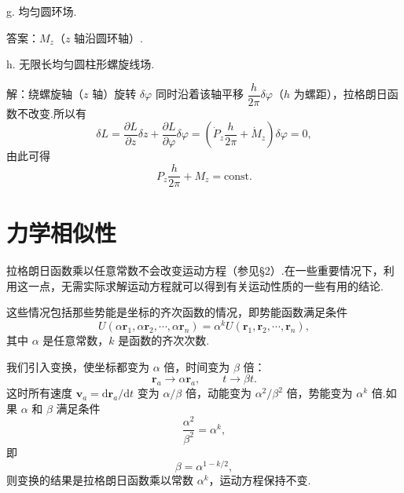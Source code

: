 \begin{xiti}
g. 均匀圆环场.

答案：$M_z$（$z$ 轴沿圆环轴）.

h. 无限长均匀圆柱形螺旋线场.

解：绕螺旋轴（$z$ 轴）旋转 $\delta\varphi$ 同时沿着该轴平移 $\dfrac{h}{2\pi}\delta\varphi$（$h$ 为螺距），拉格朗日函数不改变.所以有
\begin{equation*}
  \delta L=\frac{\partial L}{\partial z}\delta z
  +\frac{\partial L}{\partial\varphi}\delta\varphi
  =\left(\dot{P}_z\frac{h}{2\pi}+\dot{M}_z\right)\delta\varphi=0,
\end{equation*}
由此可得
\begin{equation*}
  P_z\frac{h}{2\pi}+M_z=\mathrm{const}.
\end{equation*}

\end{xiti}

\section{力学相似性}

拉格朗日函数乘以任意常数不会改变运动方程（参见§2）.在一些重要情况下，利用这一点，无需实际求解运动方程就可以得到有关运动性质的一些有用的结论.

这些情况包括那些势能是坐标的齐次函数的情况，即势能函数满足条件
\begin{equation}
  U(\alpha\boldsymbol{r}_1,\alpha\boldsymbol{r}_2,\cdots,\alpha\boldsymbol{r}_n)
  =\alpha^k U(\boldsymbol{r}_1,\boldsymbol{r}_2,\cdots,\boldsymbol{r}_n),
\end{equation}
其中 $\alpha$ 是任意常数，$k$ 是函数的齐次次数.

我们引入变换，使坐标都变为 $\alpha$ 倍，时间变为 $\beta$ 倍：
\begin{equation*}
  \boldsymbol{r}_a\to\alpha\boldsymbol{r}_a,\qquad t\to\beta t.
\end{equation*}
这时所有速度 $\boldsymbol{v}_a=\mathrm{d}\boldsymbol{r}_a/\mathrm{d}t$ 变为 $\alpha/\beta$ 倍，动能变为 $\alpha^2/\beta^2$ 倍，势能变为 $\alpha^k$ 倍.如果 $\alpha$ 和 $\beta$ 满足条件
\begin{equation*}
  \frac{\alpha^2}{\beta^2}=\alpha^k,
\end{equation*}
即
\begin{equation*}
  \beta=\alpha^{1-k/2},
\end{equation*}
则变换的结果是拉格朗日函数乘以常数 $\alpha^k$，运动方程保持不变.

